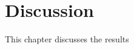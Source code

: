 \documentclass[FCD_GNN.tex]{subfiles}
\begin{document}
\chapter{Discussion}
This chapter discusses the results
\end{document}
